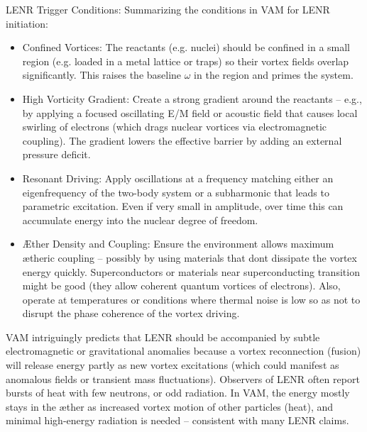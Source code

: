 LENR Trigger Conditions: Summarizing the conditions in VAM for LENR initiation:


\begin{itemize}

\item 
Confined Vortices: The reactants (e.g. nuclei) should be confined in a small region (e.g. loaded in a metal lattice or traps) so their vortex fields overlap significantly. This raises the baseline $\omega$ in the region and primes the system.




\item 
High Vorticity Gradient: Create a strong gradient around the reactants – e.g., by applying a focused oscillating E/M field or acoustic field that causes local swirling of electrons (which drags nuclear vortices via electromagnetic coupling). The gradient lowers the effective barrier by adding an external pressure deficit.




\item 
Resonant Driving: Apply oscillations at a frequency matching either an eigenfrequency of the two-body system or a subharmonic that leads to parametric excitation. Even if very small in amplitude, over time this can accumulate energy into the nuclear degree of freedom.




\item 
Æther Density and Coupling: Ensure the environment allows maximum ætheric coupling – possibly by using materials that don\rqs t dissipate the vortex energy quickly. Superconductors or materials near superconducting transition might be good (they allow coherent quantum vortices of electrons). Also, operate at temperatures or conditions where thermal noise is low so as not to disrupt the phase coherence of the vortex driving.




\end{itemize}

VAM intriguingly predicts that LENR should be accompanied by subtle electromagnetic or gravitational anomalies because a vortex reconnection (fusion) will release energy partly as new vortex excitations (which could manifest as anomalous fields or transient mass fluctuations). Observers of LENR often report bursts of heat with few neutrons, or odd radiation. In VAM, the energy mostly stays in the æther as increased vortex motion of other particles (heat), and minimal high-energy radiation is needed – consistent with many LENR claims.


